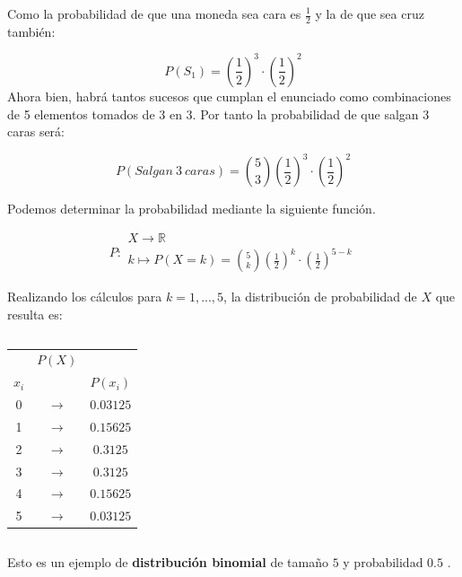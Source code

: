 \documentclass[11pt]{beamer}
\begin{document}
\begin{frame}{}
Como la probabilidad de que una moneda sea cara es $\frac{1}{2}$ y la de que sea cruz también:

$$P\left(S_1\right)=\left(\frac{1}{2}\right)^3\cdot  \left(\frac{1}{2}\right)^2$$
Ahora bien, habrá tantos sucesos que cumplan el enunciado como combinaciones de 5 elementos tomados de 3 en 3. Por tanto la probabilidad de que salgan 3 caras será:

$$P\left(Salgan \ 3 \ caras\right)=\binom{5}{3}\left(\frac{1}{2}\right)^3\cdot  \left(\frac{1}{2}\right)^2$$

\end{frame}

\begin{frame}{}

Podemos determinar la probabilidad mediante la siguiente función.

$$P\colon \begin{array}{l} 
          X \rightarrow \mathbb{R} \\ 
          k\mapsto P(X=k)=\binom{5}{k}\left(\frac{1}{2}\right)^k\cdot  \left(\frac{1}{2}\right)^{5-k} 
         \end{array}$$

\end{frame}


\begin{frame}{}
Realizando los cálculos para $k = 1,...,5 $, la distribución de probabilidad de $X$ que resulta es:
\begin{columns}
\begin{column}{0.3\textwidth}
\begin{center}
\begin{tabular}{ccc}
 & $P(X)$ &  \\
$x_i$ &  &  $P(x_i)$\\ \hline 
0 & $\rightarrow$ & $0.03125$ \\ 
1 & $\rightarrow$ & $0.15625$ \\ 
2 & $\rightarrow$ & $0.3125$ \\ 
3 & $\rightarrow$ & $0.3125$ \\ 
4 & $\rightarrow$ & $0.15625$ \\ 
5 & $\rightarrow$ & $0.03125$ \\ 
\end{tabular} 
\end{center}
\end{column}
\begin{column}{0.7\textwidth}
\begin{center}

\end{center}
\end{column}

\end{columns}
\pause
Esto es un ejemplo de \textbf{distribución binomial} de tamaño $5$ y probabilidad $0.5$ .
\end{frame}
\end{document}
